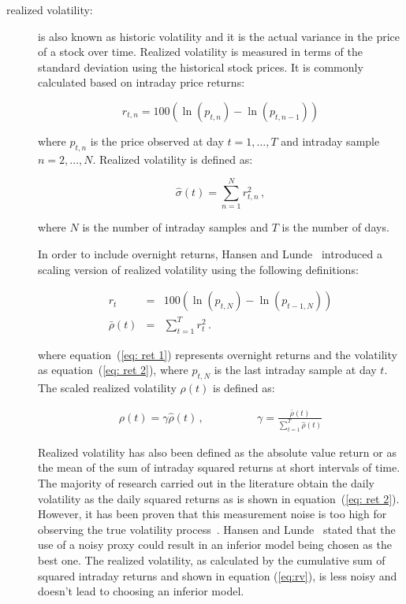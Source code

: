 \begin{description}%
\item[realized volatility:] is also known as historic volatility and
it is the actual variance in the price of a stock over time.
Realized volatility is measured in terms of the standard deviation
using the historical stock prices. It is commonly calculated based on
intraday price returns:

\begin{equation}
\label{eq:retintra}
r_{t,n}=100(\ln(p_{t,n}) - \ln(p_{t,n-1}))
\end{equation}

\noindent where $p_{t,n}$ is the price observed at day $t=1,\dots,T$ and
intraday sample $n=2,\dots,N$. Realized volatility is defined as:

\begin{equation}
\label{eq:rv}
    \hat{\sigma}(t) = \sum_{n=1}^N r_{t,n}^2 \, , 
\end{equation}

\noindent where $N$ is the number of intraday samples and $T$ is the
number of days. 

In order to include overnight returns, Hansen and
Lunde~\cite{hansen+lunde2005} introduced a scaling version of
realized volatility using the following definitions:

\begin{eqnarray}
r_{t}&=&100(\ln(p_{t,N}) - \ln(p_{t-1,N})) \label{eq: ret 1} \\
\bar{\rho}(t) &=& \sum_{t=1}^T r_{t}^2  \label{eq: ret 2} \, .
\end{eqnarray}

\noindent where equation~(\ref{eq: ret 1}) represents overnight 
returns and the volatility as 
equation~(\ref{eq: ret 2}), where $p_{t,N}$ is the last intraday 
sample at day $t$. The scaled realized volatility $\rho(t)$ is 
defined as:

\begin{eqnarray}
\label{eq:srv}
\rho(t) = \gamma \hat{\rho}(t) \, , \qquad & \qquad \gamma = \displaystyle \frac{\bar{\rho}(t)}{\displaystyle\sum_{t=1}^T \hat{\rho}(t)}
\end{eqnarray}


Realized volatility has also been defined as the absolute value return or as the
mean of the sum of intraday squared returns at short intervals of time. The
majority of research carried out in the literature obtain the daily volatility
as the daily squared returns as is shown in equation~(\ref{eq: ret 2}).
However, it has been proven that this measurement noise is too high for
observing the true volatility process~\cite{andersen+bollerslev1998}. Hansen and
Lunde~\cite{hansen+lunde2006} stated that the use of a noisy proxy could result
in an inferior model being chosen as the best one. The realized volatility, as
calculated by the cumulative sum of squared intraday returns and shown in
equation (\ref{eq:rv}), is less noisy and doesn't lead to choosing an inferior
model.   



\end{description}
